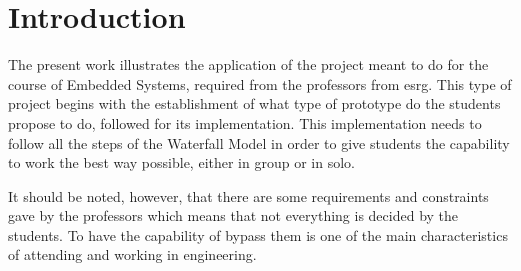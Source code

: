 %
%
%
\chapter{Introduction}%
\label{ch:introduction}
The present work illustrates the application of the project meant to do for the course of Embedded Systems, required from the professors from \gls{esrg}.
This type of project begins with the establishment of what type of prototype do the students propose to do, followed for its implementation. This implementation needs to follow all the steps of the Waterfall Model in order to give students the capability to work the best way possible, either in group or in solo.

It should be noted, however, that there are some requirements and constraints gave by the professors which means that not everything is decided by the students. 
To have the capability of bypass them is one of the main characteristics of attending and working in engineering.
%





%
